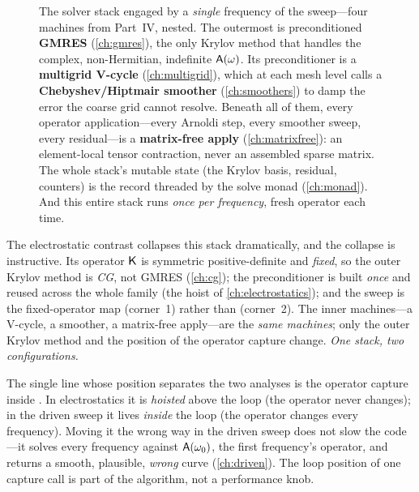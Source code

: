 \begin{figure}[p]
\caption[The solver stack for one frequency]{The solver stack engaged by a
\emph{single} frequency of the sweep---four machines from Part~IV, nested. The
outermost is preconditioned \textbf{GMRES} (\cref{ch:gmres}), the only Krylov
method that handles the complex, non-Hermitian, indefinite $\mathsf{A}(\omega)$. Its
preconditioner is a \textbf{multigrid V-cycle} (\cref{ch:multigrid}), which at each
mesh level calls a \textbf{Chebyshev/Hiptmair smoother} (\cref{ch:smoothers}) to
damp the error the coarse grid cannot resolve. Beneath all of them, every
operator application---every Arnoldi step, every smoother sweep, every residual---is
a \textbf{matrix-free apply} (\cref{ch:matrixfree}): an element-local tensor
contraction, never an assembled sparse matrix. The whole stack's mutable state (the
Krylov basis, residual, counters) is the  record threaded by the
solve monad (\cref{ch:monad}). And this entire stack runs \emph{once per
frequency}, fresh operator each time.}
\label{fig:trace-solverstack}
\end{figure}

The electrostatic contrast collapses this stack dramatically, and the collapse is
instructive. Its operator $\mathsf{K}$ is symmetric positive-definite and \emph{fixed},
so the outer Krylov method is \emph{CG}, not GMRES (\cref{ch:cg}); the
preconditioner is built \emph{once} and reused across the whole family (the hoist
of \cref{ch:electrostatics}); and the sweep is the fixed-operator map
 (corner~1) rather than  (corner~2). The
inner machines---a V-cycle, a smoother, a matrix-free apply---are the \emph{same
machines}; only the outer Krylov method and the position of the operator capture
change. \emph{One stack, two configurations.}

\begin{pitfall}
The single line whose position separates the two analyses is the operator capture
inside . In electrostatics it is \emph{hoisted} above the
loop (the operator never changes); in the driven sweep it lives \emph{inside} the
loop (the operator changes every frequency). Moving it the wrong way in the driven
sweep does not slow the code---it solves every frequency against
$\mathsf{A}(\omega_0)$, the first frequency's operator, and returns a smooth,
plausible, \emph{wrong} curve (\cref{ch:driven}). The loop position of one capture
call is part of the algorithm, not a performance knob.
\end{pitfall}

